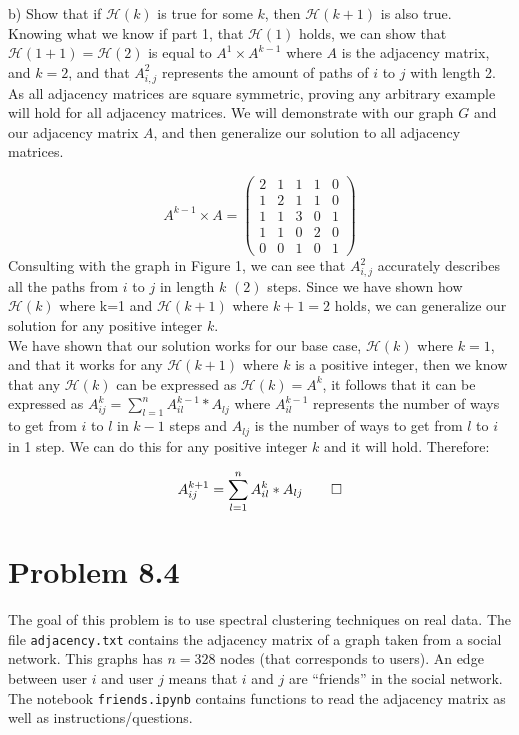 \documentclass[12pt,twoside]{article}
\begin{document}
b) Show that if $\mathcal{H}(k)$ is true for some $k$, then $\mathcal{H}(k+1)$ is also true.\\

Knowing what we know if part 1, that $\mathcal{H}(1)$ holds, we can show that $\mathcal{H}(1+1) = \mathcal{H}(2)$ is equal to $A^1 \times A^{k-1}$ where $A$ is the adjacency matrix, and $k=2$, and that $A_{i,j}^2$ represents the amount of paths of $i$ to $j$ with length 2. As all adjacency matrices are square symmetric, proving any arbitrary example will hold for all adjacency matrices. We will demonstrate with our graph $G$ and our adjacency matrix $A$, and then generalize our solution to all adjacency matrices.

$$
    A^{k-1} \times A = \begin{pmatrix} 
    2 & 1 & 1 & 1 & 0 \\
    1 & 2 & 1 & 1 & 0 \\
    1 & 1 & 3 & 0 & 1 \\
    1 & 1 & 0 & 2 & 0 \\
    0 & 0 & 1 & 0 & 1 
    \end{pmatrix}
$$
Consulting with the graph in Figure 1, we can see that $A_{i,j}^2$ accurately describes all the paths from $i$ to $j$ in length $k$ $(2)$ steps. Since we have shown how $\mathcal{H}(k)$ where k=1 and $\mathcal{H}(k+1)$ where $k+1 = 2$ holds, we can generalize our solution for any positive integer $k$. \\

We have shown that our solution works for our base case, $\mathcal{H}(k)$ where $k=1$, and that it works for any $\mathcal{H}(k+1)$ where $k$ is a positive integer, then we know that any $\mathcal{H}(k)$ can be expressed as $\mathcal{H}(k)=A^k$, it follows that it can be expressed as $A^k_{ij} = \sum\limits^n_{l=1}A^{k-1}_{il}*A_{lj}$ where $A^{k-1}_{il}$ represents the number of ways to get from $i$ to $l$ in $k-1$ steps and $A_{lj}$ is the number of ways to get from $l$ to $i$ in 1 step. We can do this for any positive integer $k$ and it will hold. Therefore:

$$A^{k+1}_{ij} = \sum\limits^n_{l=1}A^{k}_{il}*A_{lj} \qed $$


\vspace{1mm}


\section{Problem 8.4}
	The goal of this problem is to use spectral clustering techniques on real data.
	The file \texttt{adjacency.txt} contains the adjacency matrix of a graph taken from a social network. This graphs has $n=328$ nodes (that corresponds to users). An edge between user $i$ and user $j$ means that $i$ and $j$ are ``friends'' in the social network.
	The notebook \texttt{friends.ipynb} contains functions to read the adjacency matrix as well as instructions/questions.
	\\
\end{document}
